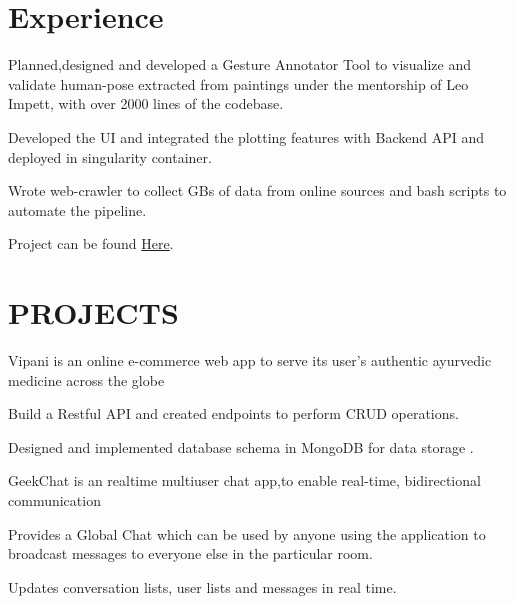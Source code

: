 \documentclass[]{deedy-resume-openfont}
\begin{document}
\hfill
\begin{minipage}[t]{0.66\textwidth} 


\section{Experience}

\vspace{\topsep} %
\begin{tightemize}\item Planned,designed and developed a Gesture Annotator Tool to visualize and
validate human-pose extracted from  paintings under the mentorship of Leo Impett, with over 2000 lines of the codebase.
\item Developed the UI and integrated the plotting features with Backend API and deployed in singularity container.
\item Wrote web-crawler to collect GBs of data from online sources and bash scripts
to automate the pipeline.
\item Project can be found  \href{https://summerofcode.withgoogle.com/archive/2019/projects/5565179075493888/}{Here}.
\end{tightemize}
\sectionsep

\sectionsep


\section{PROJECTS}
Vipani is an online e-commerce web app to serve its user’s authentic ayurvedic
medicine across the globe
\begin{tightemize}
\item Build a Restful API and created endpoints to perform CRUD operations.
\item Designed and implemented database schema in MongoDB for data storage .
\end{tightemize}
\sectionsep

GeekChat is an realtime multiuser chat app,to enable real-time, bidirectional communication
\begin{tightemize}
\item Provides a Global Chat which can be used by anyone using the application to
broadcast messages to everyone else in the particular room.
\item Updates conversation lists, user lists and messages in real time.
\end{tightemize}
\sectionsep


\end{minipage}
\end{document}
